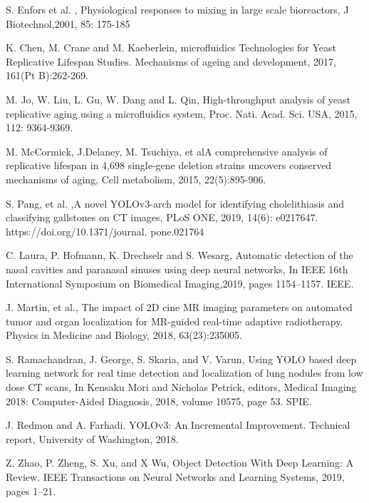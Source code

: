 \documentclass[conference]{IEEEtran}
\begin{document}
\begin{thebibliography}{00}
S. Enfors  et al. , Physiological responses to mixing in large scale bioreactors, J Biotechnol,2001, 85: 175-185



K. Chen, M. Crane and  M. Kaeberlein, microfluidics Technologies for Yeast Replicative Lifespan Studies. Mechanisms of ageing and development, 2017, 161(Pt B):262-269.



 M. Jo, W. Liu, L. Gu, W. Dang and  L. Qin, High-throughput analysis of yeast replicative aging using a microfluidics system, Proc. Nati. Acad. Sci. USA, 2015, 112: 9364-9369.



M. McCormick,  J.Delaney, M. Tsuchiya, et alA comprehensive analysis of replicative lifespan in 4,698 single-gene deletion strains uncovers conserved mechanisms of aging, Cell metabolism, 2015, 22(5):895-906.


S. Pang,  et al. ,A novel YOLOv3-arch model for identifying cholelithiasis and classifying gallstones on CT images, PLoS ONE, 2019, 14(6): e0217647. https://doi.org/10.1371/journal. pone.021764

C.  Laura, P. Hofmann, K. Drechselr  and S. Wesarg, Automatic detection of the nasal cavities and paranasal sinuses using deep neural networks, In IEEE 16th International Symposium on Biomedical Imaging,2019, pages 1154–1157. IEEE.

J. Martin, et al., The impact of 2D cine MR imaging parameters on automated tumor and organ localization for MR-guided real-time adaptive radiotherapy. Physics in Medicine and Biology, 2018, 63(23):235005.

S. Ramachandran, J. George, S. Skaria, and  V. Varun,  Using YOLO based deep learning network for real time detection and localization of lung nodules from low dose CT scans, In Kensaku Mori and Nicholas Petrick, editors, Medical Imaging 2018: Computer-Aided Diagnosis, 2018, volume 10575, page 53. SPIE.

J. Redmon and A. Farhadi. YOLOv3: An Incremental Improvement. Technical report, University of Washington, 2018.

Z. Zhao, P. Zheng, S. Xu, and X Wu, Object Detection With Deep Learning: A Review. IEEE Transactions on Neural Networks and Learning Systems, 2019, pages 1–21.


\end{thebibliography}
\end{document}
